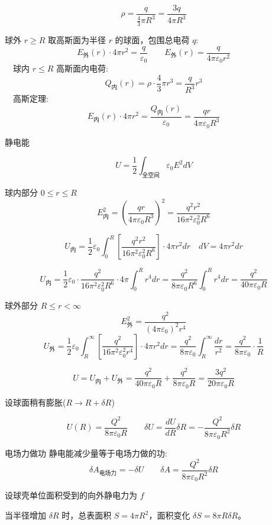 \documentclass{article}
\begin{document}
$$\rho = \frac{q}{\frac{4}{3}\pi R^3} = \frac{3q}{4\pi R^3}$$

球外 $ r \ge R $
取高斯面为半径 $ r $ 的球面，包围总电荷 $ q $:
$$E_{\text{外}}(r) \cdot 4\pi r^2 = \frac{q}{\varepsilon_0}\qquad E_{\text{外}}(r) = \frac{q}{4\pi\varepsilon_0 r^2}$$
$\quad$球内 $ r \le R $
高斯面内电荷:
$$Q_{\text{内}}(r) = \rho \cdot \frac{4}{3}\pi r^3 = \frac{q}{R^3} r^3$$
$\quad$高斯定理:
$$E_{\text{内}}(r) \cdot 4\pi r^2 = \frac{Q_{\text{内}}(r)}{\varepsilon_0}= \frac{q r}{4\pi\varepsilon_0 R^3}$$




静电能

$$U = \frac{1}{2} \int_{\text{全空间}} \varepsilon_0 E^2  dV$$

球内部分 $ 0 \le r \le R $
$$E_{\text{内}}^2 = \left( \frac{q r}{4\pi\varepsilon_0 R^3} \right)^2= \frac{q^2 r^2}{16\pi^2 \varepsilon_0^2 R^6}$$

$$U_{\text{内}} = \frac{1}{2} \varepsilon_0 \int_0^R \left[ \frac{q^2 r^2}{16\pi^2 \varepsilon_0^2 R^6} \right] \cdot 4\pi r^2  dr\quad dV = 4\pi r^2 dr $$

$$U_{\text{内}} = \frac{1}{2} \varepsilon_0 \cdot \frac{q^2}{16\pi^2 \varepsilon_0^2 R^6} \cdot 4\pi \int_0^R r^4  dr= \frac{q^2}{8\pi \varepsilon_0 R^6} \int_0^R r^4  dr= \frac{q^2}{40\pi \varepsilon_0 R}$$



球外部分 $ R \le r < \infty $
$$E_{\text{外}}^2 = \frac{q^2}{(4\pi\varepsilon_0)^2 r^4}$$
$$U_{\text{外}} = \frac{1}{2} \varepsilon_0 \int_R^\infty \left[ \frac{q^2}{16\pi^2 \varepsilon_0^2 r^4} \right] \cdot 4\pi r^2  dr= \frac{q^2}{8\pi \varepsilon_0} \int_R^\infty \frac{dr}{r^2}= \frac{q^2}{8\pi \varepsilon_0} \cdot \frac{1}{R}$$


$$U = U_{\text{内}} + U_{\text{外}}= \frac{q^2}{40\pi \varepsilon_0 R} + \frac{q^2}{8\pi \varepsilon_0 R}= \frac{3q^2}{20\pi \varepsilon_0 R}$$


\newpage

设球面稍有膨胀($R\to R+\delta R$)

$$U(R) = \frac{Q^2}{8\pi\varepsilon_0 R}\qquad \delta U = \frac{dU}{dR} \delta R= -\frac{Q^2}{8\pi\varepsilon_0 R^2} \delta R$$

电场力做功
静电能减少量等于电场力做的功:
$$\delta A_{\text{电场力}} = -\delta U\qquad \delta A = \frac{Q^2}{8\pi\varepsilon_0 R^2} \delta R$$

设球壳单位面积受到的向外静电力为 $ f $

当半径增加 $\delta R$ 时，总表面积 $ S = 4\pi R^2 $，面积变化 $\delta S = 8\pi R \delta R$。
\end{document}
